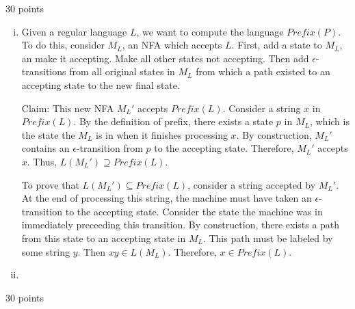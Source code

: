 \documentclass[12pt]
{article}
\newenvironment{proof}[1][Proof]{\begin{trivlist}
\item[\hskip \labelsep {\bfseries #1}]}{\end{trivlist}}
\begin{document}
\begin{proof}[Problem 2] 30 points

\begin{enumerate}[i.]

\item Given a regular language $L$, we want to compute the language
  $Prefix(P)$.  To do this, consider $M_L$, an NFA which accepts
  $L$. First, add a state to $M_L$, an make it accepting.  Make all
  other states not accepting.  Then add $\epsilon$-transitions from
  all original states in $M_L$ from which a path existed to an
  accepting state to the new final state.

Claim:  This new NFA $M_L'$ accepts $Prefix(L)$.  Consider a string
$x$ in $Prefix(L)$.  By the definition of prefix, there exists a state
$p$ in $M_L$, which is the state the $M_L$ is in when it finishes
processing $x$.  By construction, $M_L'$ contains an
$\epsilon$-transition from $p$ to the accepting state.  Therefore,
$M_L'$ accepts $x$.  Thus, $L(M_L') \supseteq Prefix(L)$.  

To prove that $L(M_L') \subseteq Prefix(L)$, consider a string
accepted by $M_L'$.  At the end of processing this string, the machine
must have taken an $\epsilon$-transition to the accepting state.
Consider the state the machine was in immediately preceeding this
transition.  By construction, there exists a path from this state to
an accepting state in $M_L$.  This path must be labeled by some string
$y$.  Then $xy \in L(M_L)$.  Therefore, $x \in Prefix(L)$.  

\addtocounter{enumi}{1}
\item

\end{enumerate}

\end{proof}

\begin{proof}[Problem 3] 30 points


\end{proof}
\end{document}
